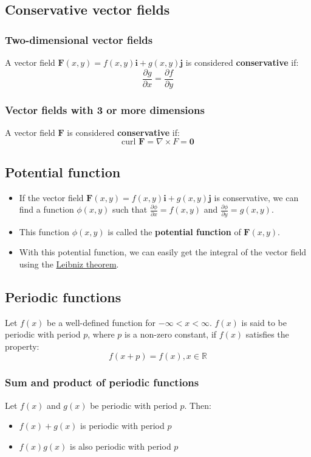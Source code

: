 \documentclass[11pt]{article}
\begin{document}
\subsection{Conservative vector fields}
\label{sec:org3bb210f}

\subsubsection{Two-dimensional vector fields}
\label{sec:orge0f6b81}
A vector field \(\boldsymbol{F} (x, y) = f(x, y) \boldsymbol{i} + g(x, y) \boldsymbol{j}\) is considered \textbf{conservative} if:
\[\frac{\partial g}{\partial x} = \frac{\partial f}{\partial y}\]
\subsubsection{Vector fields with 3 or more dimensions}
\label{sec:org4c4a844}
A vector field \(\boldsymbol{F}\) is considered \textbf{conservative} if:
\[\text{curl } \boldsymbol{F} = \nabla \times F = \boldsymbol{0}\]
\subsection{Potential function}
\label{sec:org9f8e734}
\begin{itemize}
\item If the vector field \(\boldsymbol{F} (x, y) = f(x, y) \boldsymbol{i} + g(x, y) \boldsymbol{j}\) is conservative, we can find a function \(\phi (x, y)\) such that \(\frac{\partial \phi}{\partial x} = f(x, y)\) and \(\frac{\partial \phi}{\partial y} = g(x, y)\).
\item This function \(\phi (x, y)\) is called the \textbf{potential function} of \(\boldsymbol{F} (x, y)\).
\item With this potential function, we can easily get the integral of the vector field using the \hyperref[orgbcda0a5]{Leibniz theorem}.
\end{itemize}
\subsection{Periodic functions}
\label{sec:org3475afd}
Let \(f(x)\) be a well-defined function for \(- \infty < x < \infty\). \(f(x)\) is said to be periodic with period \(p\), where \(p\) is a non-zero constant, if \(f(x)\) satisfies the property:
\[f(x + p) = f(x), x \in \mathbb{R}\]
\subsubsection{Sum and product of periodic functions}
\label{sec:org1fbe409}
Let \(f(x)\) and \(g(x)\) be periodic with period \(p\). Then:
\begin{itemize}
\item \(f(x) + g(x)\) is periodic with period \(p\)
\item \(f(x) g(x)\) is also periodic with period \(p\)
\end{itemize}
\end{document}
